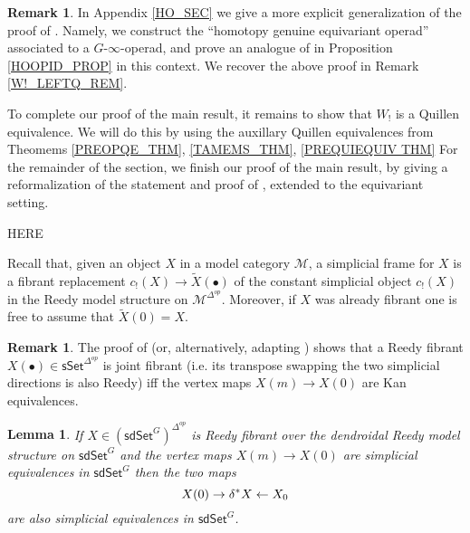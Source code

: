 \documentclass[a4paper,10pt
,draft
]{article}%
\numberwithin{equation}{section}
\numberwithin{figure}{section}
\newtheorem{lemma}[equation]{Lemma}%
\theoremstyle{definition} %
\newtheorem{remark}[equation]{Remark}%
\newcommand{\1}{\ensuremath{\mathbbm 1}}%
\begin{document}
\begin{remark}
      In Appendix \ref{HO_SEC} we give a more explicit generalization of the proof of \cite[Prop. 4.9]{CM13b}.
      Namely, we construct the ``homotopy genuine equivariant operad'' associated to a $G$-$\infty$-operad,
      and prove an analogue of \cite[Prop. 4.8]{CM13b} in Proposition \ref{HOOPID_PROP} in this context.
      We recover the above proof in Remark \ref{W!_LEFTQ_REM}.
\end{remark}







To complete our proof of the main result, it remains to show that $W_!$ is a Quillen equivalence.
We will do this by using the auxillary Quillen equivalences from Theomems \ref{PREOPQE_THM}, \ref{TAMEMS_THM}, \ref{PREQUIEQUIV THM}
For the remainder of the section, we finish our proof of the main result,
by giving a reformalization of the statement and proof of \cite[Thm. 8.14]{CM13b}, extended to the equivariant setting.



{\color{red} HERE}


Recall that, given an object $X$ in a model category $\mathcal{M}$,
a simplicial frame for $X$ is a fibrant replacement
$c_!(X) \to \widetilde{X}(\bullet)$ of the constant 
simplicial object $c_!(X)$ in the Reedy model structure on $\mathcal{M}^{\Delta^{op}}$.
Moreover, if $X$ was already fibrant one is free to assume that $\widetilde{X}(0) = X$.

\begin{remark}\label{JOINTFIB REM}
	The proof of \cite[Prop. 4.5(ii)]{BP_edss}
	(or, alternatively, adapting \cite[Prop. 4.24(ii)]{BP_edss})
	shows that a Reedy fibrant $X(\bullet) \in \mathsf{sSet}^{\Delta^{op}}$
	is joint fibrant (i.e. its transpose swapping the two simplicial directions is also Reedy)
	iff the vertex maps $X(m) \to X(0)$
	are Kan equivalences.
\end{remark}

\begin{lemma}\label{DIAGWE LEM}
If $X \in (\mathsf{sdSet}^G)^{\Delta^{op}}$ is
Reedy fibrant 
over the dendroidal Reedy model structure 
on $\mathsf{sdSet}^G$
and the vertex maps 
$X(m) \to X(0)$ are simplicial equivalences in $\mathsf{sdSet}^G$
then the two maps
\[
X(0) \to \delta^{\**} X \leftarrow X_0
\]
are also simplicial equivalences in $\mathsf{sdSet}^G$.
\end{lemma}
\end{document}
